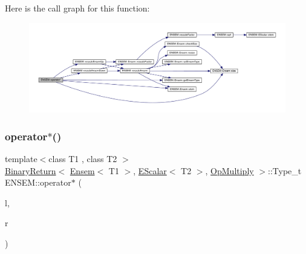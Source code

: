 Here is the call graph for this function\+:\nopagebreak
\begin{figure}[H]
\begin{center}
\leavevmode
\includegraphics[width=350pt]{d1/d9e/group__eensem_gacf3333408054c89c251c9c44d25fa321_cgraph}
\end{center}
\end{figure}
\mbox{\label{group__eensem_gad8e9dadde3e0114542b222f4631cc216}} 
\subsubsection{\texorpdfstring{operator$\ast$()}{operator*()}\hspace{0.1cm}{\footnotesize\ttfamily [2/11]}}
{\footnotesize\ttfamily template$<$class T1 , class T2 $>$ \\
\mbox{\hyperlink{structENSEM_1_1BinaryReturn}{Binary\+Return}}$<$ \mbox{\hyperlink{classENSEM_1_1Ensem}{Ensem}}$<$ T1 $>$, \mbox{\hyperlink{classENSEM_1_1EScalar}{E\+Scalar}}$<$ T2 $>$, \mbox{\hyperlink{structENSEM_1_1OpMultiply}{Op\+Multiply}} $>$\+::Type\+\_\+t E\+N\+S\+E\+M\+::operator$\ast$ (\begin{DoxyParamCaption}\item[{const \mbox{\hyperlink{classENSEM_1_1Ensem}{Ensem}}$<$ T1 $>$ \&}]{l,  }\item[{const \mbox{\hyperlink{classENSEM_1_1EScalar}{E\+Scalar}}$<$ T2 $>$ \&}]{r }\end{DoxyParamCaption})\hspace{0.3cm}{\ttfamily [inline]}}

